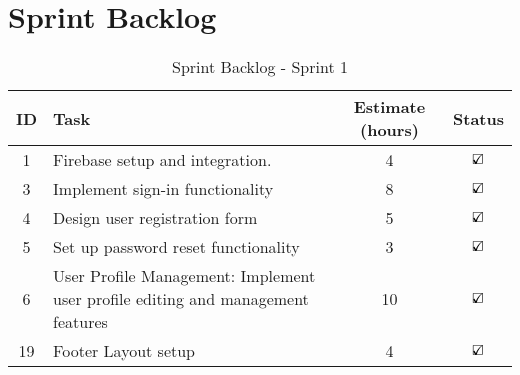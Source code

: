 


\section{Sprint Backlog}\label{sprint_backlog}

\begin{table}[H]
    \centering
    \caption*{Sprint Backlog - Sprint 1}
    \begin{tabular}{|c|p{5cm}|c|c|}
        \hline
        \textbf{ID} & \textbf{Task} & \textbf{Estimate (hours)} & \textbf{Status} \\
        \hline
        1 & Firebase setup and integration. & 4 & $\text{\rlap{$\checkmark$}}\square$\\
        \hline
        3 & Implement sign-in functionality & 8 & $\text{\rlap{$\checkmark$}}\square$\\
        \hline
        4 & Design user registration form & 5 & $\text{\rlap{$\checkmark$}}\square$\\
        \hline
        5 & Set up password reset functionality & 3 & $\text{\rlap{$\checkmark$}}\square$\\
        \hline
        6 & User Profile Management: Implement user profile editing and management features & 10 & $\text{\rlap{$\checkmark$}}\square$\\
        \hline
        19 & Footer Layout setup & 4 & $\text{\rlap{$\checkmark$}}\square$\\
        \hline
    \end{tabular}
\end{table}


